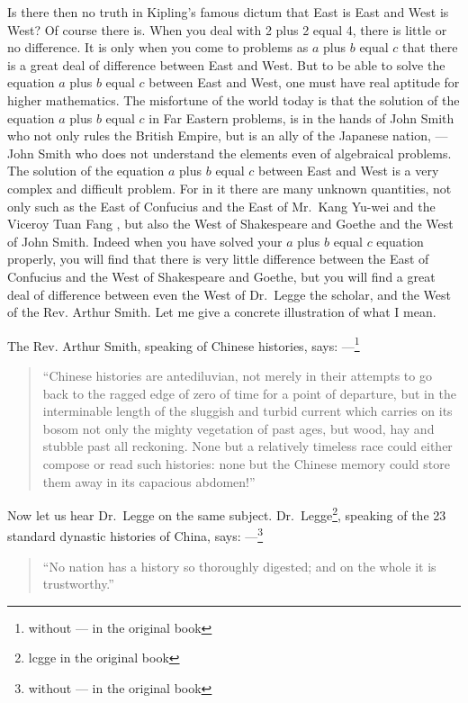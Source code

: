 Is there then no truth in Kipling's famous dictum that East is East and West is West?
Of course there is.
When you deal with 2 plus 2 equal 4, there is little or no difference.
It is only when you come to problems as $a$ plus $b$ equal $c$ that there is a great deal of difference between East and West.
But to be able to solve the equation $a$ plus $b$ equal $c$ between East and West, one must have real aptitude for higher mathematics.
The misfortune of the world today is that the solution of the equation $a$ plus $b$ equal $c$ in Far Eastern problems, is in the hands of John Smith who not only rules the British Empire, but is an ally of the Japanese nation, --- John Smith who does not understand the elements even of algebraical problems.
The solution of the equation $a$ plus $b$ equal $c$ between East and West is a very complex and difficult problem.
For in it there are many unknown quantities, not only such as the East of Confucius and the East of Mr.~Kang Yu-wei  and the Viceroy Tuan Fang , but also the West of Shakespeare and Goethe and the West of John Smith.
Indeed when you have solved your $a$ plus $b$ equal $c$ equation properly, you will find that there is very little difference between the East of Confucius and the West of Shakespeare and Goethe, but you will find a great deal of difference between even the West of Dr.~Legge  the scholar, and the West of the Rev. Arthur Smith.
Let me give a concrete illustration of what I mean.

The Rev. Arthur Smith, speaking of Chinese histories, says: ---\footnote{without --- in the original book}
\begin{quote}
``Chinese histories are antediluvian, not merely in their attempts to go back to the ragged edge of zero of time for a point of departure, but in the interminable length of the sluggish and turbid current which carries on its bosom not only the mighty vegetation of past ages, but wood, hay and stubble past all reckoning. None but a relatively timeless race could either compose or read such histories: none but the Chinese memory could store them away in its capacious abdomen!''
\end{quote}

Now let us hear Dr.~Legge on the same subject.
Dr.~Legge\footnote{lcgge in the original book}, speaking of the 23 standard dynastic histories of China, says: ---\footnote{without --- in the original book}
\begin{quote}
``No nation has a history so thoroughly digested; and on the whole it is trustworthy.''
\end{quote}

